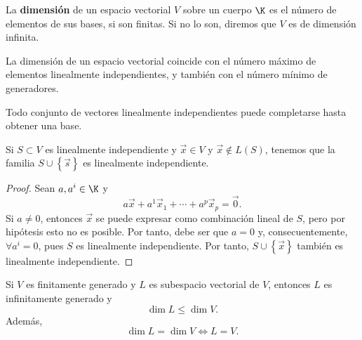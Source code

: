 \begin{fdefinition}[Dimensión]
\normalfont La \textbf{dimensión} de un espacio vectorial $\displaystyle V $ sobre un cuerpo $\displaystyle \K $ es el número de elementos de sus bases, si son finitas. Si no lo son, diremos que $\displaystyle V $ es de dimensión infinita.
\end{fdefinition}

\begin{fcolorary}[]
\normalfont La dimensión de un espacio vectorial coincide con el número máximo de elementos linealmente independientes, y también con el número mínimo de generadores.
\end{fcolorary}

\begin{fcolorary}[]
\normalfont Todo conjunto de vectores linealmente independientes puede completarse hasta obtener una base.
\end{fcolorary}

\begin{flema}[]
	\normalfont Si $S \subset V$ es linealmente independiente y $\displaystyle \vec{x} \in V $ y $\displaystyle \vec{x} \not\in L\left(S\right) $, tenemos que la familia $\displaystyle S \cup \left\{ \vec{s}\right\}   $ es linealmente independiente. 
\end{flema}

\begin{proof}
Sean $\displaystyle a,a^{i} \in \K $ y 
\[a\vec{x} + a^{1}\vec{x}_{1} + \cdots + a^{p}\vec{x}_{p} = \vec{0} .\]
Si $\displaystyle a \neq 0 $, entonces $\displaystyle \vec{x} $ se puede expresar como combinación lineal de $\displaystyle S $, pero por hipótesis esto no es posible. Por tanto, debe ser que $\displaystyle a = 0 $ y, consecuentemente, $\displaystyle \forall a^{i} = 0 $, pues $\displaystyle S $ es linealmente independiente. Por tanto, $\displaystyle S \cup \left\{ \vec{x}\right\}  $ también es linealmente independiente.
\end{proof}

\begin{fprop}[]
\normalfont Si $\displaystyle V $ es finitamente generado y $\displaystyle L $ es subespacio vectorial de $\displaystyle V $, entonces $\displaystyle L $ es infinitamente generado y 
\[\dim L \leq \dim V .\]
Además, 
\[\dim L = \dim V \iff L = V .\]
\end{fprop}

